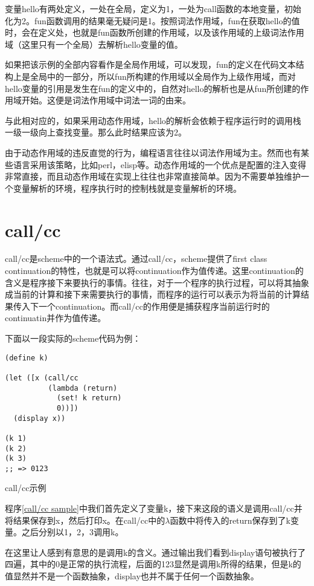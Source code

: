 变量hello有两处定义，一处在全局，定义为1，一处为call函数的本地变量，初始化为2。fun函数调用的结果毫无疑问是1。按照词法作用域，fun在获取hello的值时，会在定义处，也就是fun函数所创建的作用域，以及该作用域的上级词法作用域（这里只有一个全局）去解析hello变量的值。

如果把该示例的全部内容看作是全局作用域，可以发现，fun的定义在代码文本结构上是全局中的一部分，所以fun所构建的作用域以全局作为上级作用域，而对hello变量的引用是发生在fun的定义中的，自然对hello的解析也是从fun所创建的作用域开始。这便是词法作用域中词法一词的由来。

与此相对应的，如果采用动态作用域，hello的解析会依赖于程序运行时的调用栈一级一级向上查找变量。那么此时结果应该为2。

由于动态作用域的违反直觉的行为，编程语言往往以词法作用域为主。然而也有某些语言采用该策略，比如perl，elisp等。动态作用域的一个优点是配置的注入变得非常直接，而且动态作用域在实现上往往也非常直接简单。因为不需要单独维护一个变量解析的环境，程序执行时的控制栈就是变量解析的环境。

\section{call/cc}

call/cc是scheme中的一个语法式。通过call/cc，scheme提供了first class continuation的特性，也就是可以将continuation作为值传递。这里continuation的含义是程序接下来要执行的事情。往往，对于一个程序的执行过程，可以将其抽象成当前的计算和接下来需要执行的事情，而程序的运行可以表示为将当前的计算结果传入下一个continuation。而call/cc的作用便是捕获程序当前运行时的continuatin并作为值传递。

下面以一段实际的scheme代码为例：

\begin{code}
\begin{verbatim}
(define k)

(let ([x (call/cc
          (lambda (return)
            (set! k return)
            0))])
  (display x))

(k 1)
(k 2)
(k 3)
;; => 0123
\end{verbatim}
\caption{call/cc示例}
\label{call/cc sample}
\end{code}

程序\ref{call/cc sample}中我们首先定义了变量k，接下来这段的语义是调用call/cc并将结果保存到x，然后打印x。在call/cc中的$\lambda$函数中将传入的return保存到了k变量。之后分别以1，2，3调用k。

在这里让人感到有意思的是调用k的含义。通过输出我们看到display语句被执行了四遍，其中的0是正常的执行流程，后面的123显然是调用k所得的结果，但是k的值显然并不是一个函数抽象，display也并不属于任何一个函数抽象。

